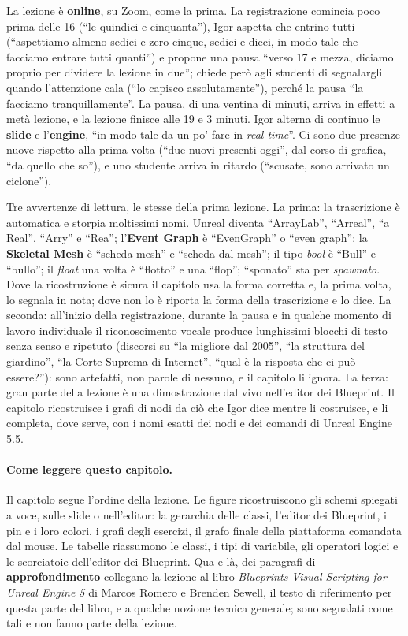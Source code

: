 La lezione è \textbf{online}, su Zoom, come la prima. La registrazione comincia poco
prima delle 16 (``le quindici e cinquanta''), Igor aspetta che entrino tutti (``aspettiamo
almeno sedici e zero cinque, sedici e dieci, in modo tale che facciamo entrare tutti
quanti'') e propone una pausa ``verso 17 e mezza, diciamo proprio per dividere la lezione
in due''; chiede però agli studenti di segnalargli quando l'attenzione cala (``lo capisco
assolutamente''), perché la pausa ``la facciamo tranquillamente''. La pausa, di una
ventina di minuti, arriva in effetti a metà lezione, e la lezione finisce alle 19 e 3
minuti. Igor alterna di continuo le \textbf{slide} e l'\textbf{engine}, ``in modo tale da
un po' fare in \emph{real time}''. Ci sono due presenze nuove rispetto alla prima volta
(``due nuovi presenti oggi'', dal corso di grafica, ``da quello che so''), e uno studente
arriva in ritardo (``scusate, sono arrivato un ciclone'').

Tre avvertenze di lettura, le stesse della prima lezione. La prima: la trascrizione è
automatica e storpia moltissimi nomi. Unreal diventa ``ArrayLab'', ``Arreal'', ``a
Real'', ``Arry'' e ``Rea''; l'\textbf{Event Graph} è ``EvenGraph'' o ``even graph''; la
\textbf{Skeletal Mesh} è ``scheda mesh'' e ``scheda dal mesh''; il tipo \emph{bool} è
``Bull'' e ``bullo''; il \emph{float} una volta è ``flotto'' e una ``flop''; ``sponato''
sta per \emph{spawnato}. Dove la ricostruzione è sicura il capitolo usa la forma
corretta e, la prima volta, lo segnala in nota; dove non lo è riporta la forma della
trascrizione e lo dice. La seconda: all'inizio della registrazione, durante la pausa e
in qualche momento di lavoro individuale il riconoscimento vocale produce lunghissimi
blocchi di testo senza senso e ripetuto (discorsi su ``la migliore dal 2005'', ``la
struttura del giardino'', ``la Corte Suprema di Internet'', ``qual è la risposta che ci
può essere?''): sono artefatti, non parole di nessuno, e il capitolo li ignora. La
terza: gran parte della lezione è una dimostrazione dal vivo nell'editor dei Blueprint.
Il capitolo ricostruisce i grafi di nodi da ciò che Igor dice mentre li costruisce, e li
completa, dove serve, con i nomi esatti dei nodi e dei comandi di Unreal Engine 5.5.

\paragraph{Come leggere questo capitolo.} Il capitolo segue l'ordine della lezione. Le
figure ricostruiscono gli schemi spiegati a voce, sulle slide o nell'editor: la gerarchia
delle classi, l'editor dei Blueprint, i pin e i loro colori, i grafi degli esercizi, il
grafo finale della piattaforma comandata dal mouse. Le tabelle riassumono le classi, i
tipi di variabile, gli operatori logici e le scorciatoie dell'editor dei Blueprint. Qua
e là, dei paragrafi di \textbf{approfondimento} collegano la lezione al libro
\emph{Blueprints Visual Scripting for Unreal Engine 5} di Marcos Romero e Brenden
Sewell, il testo di riferimento per questa parte del libro, e a qualche nozione tecnica
generale; sono segnalati come tali e non fanno parte della lezione.


